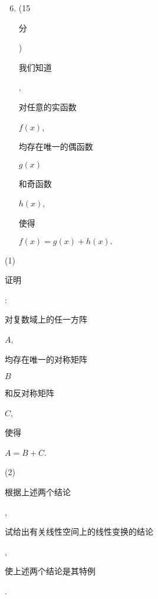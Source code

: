 \documentclass[10pt]{article}
\begin{document}
\begin{enumerate}
  \setcounter{enumi}{5}
  \item (15 \begin{CJK}{UTF8}{mj}分\end{CJK}) \begin{CJK}{UTF8}{mj}我们知道\end{CJK}, \begin{CJK}{UTF8}{mj}对任意的实函数\end{CJK} $f(x)$, \begin{CJK}{UTF8}{mj}均存在唯一的偶函数\end{CJK} $g(x)$ \begin{CJK}{UTF8}{mj}和奇函数\end{CJK} $h(x)$, \begin{CJK}{UTF8}{mj}使得\end{CJK} $f(x)=g(x)+h(x) .$
\end{enumerate}
(1) \begin{CJK}{UTF8}{mj}证明\end{CJK}: \begin{CJK}{UTF8}{mj}对复数域上的任一方阵\end{CJK} $A$, \begin{CJK}{UTF8}{mj}均存在唯一的对称矩阵\end{CJK} $B$ \begin{CJK}{UTF8}{mj}和反对称矩阵\end{CJK} $C$, \begin{CJK}{UTF8}{mj}使得\end{CJK} $A=B+C$.

(2) \begin{CJK}{UTF8}{mj}根据上述两个结论\end{CJK},\begin{CJK}{UTF8}{mj}试给出有关线性空间上的线性变换的结论\end{CJK},\begin{CJK}{UTF8}{mj}使上述两个结论是其特例\end{CJK}.
\end{document}
